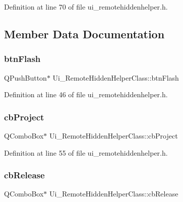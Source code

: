Definition at line 70 of file ui\+\_\+remotehiddenhelper.\+h.



\subsection{Member Data Documentation}
\hypertarget{class_ui___remote_hidden_helper_class_ae023c25b1357ab47d7457aa6ce3ea8d5}{}\label{class_ui___remote_hidden_helper_class_ae023c25b1357ab47d7457aa6ce3ea8d5} 
\subsubsection{\texorpdfstring{btn\+Flash}{btnFlash}}
{\footnotesize\ttfamily Q\+Push\+Button$\ast$ Ui\+\_\+\+Remote\+Hidden\+Helper\+Class\+::btn\+Flash}



Definition at line 46 of file ui\+\_\+remotehiddenhelper.\+h.

\hypertarget{class_ui___remote_hidden_helper_class_a7caecd9759e6ff52726b548279021140}{}\label{class_ui___remote_hidden_helper_class_a7caecd9759e6ff52726b548279021140} 
\subsubsection{\texorpdfstring{cb\+Project}{cbProject}}
{\footnotesize\ttfamily Q\+Combo\+Box$\ast$ Ui\+\_\+\+Remote\+Hidden\+Helper\+Class\+::cb\+Project}



Definition at line 55 of file ui\+\_\+remotehiddenhelper.\+h.

\hypertarget{class_ui___remote_hidden_helper_class_aa7a97b774b94a003204ab5e01dc435ae}{}\label{class_ui___remote_hidden_helper_class_aa7a97b774b94a003204ab5e01dc435ae} 
\subsubsection{\texorpdfstring{cb\+Release}{cbRelease}}
{\footnotesize\ttfamily Q\+Combo\+Box$\ast$ Ui\+\_\+\+Remote\+Hidden\+Helper\+Class\+::cb\+Release}



